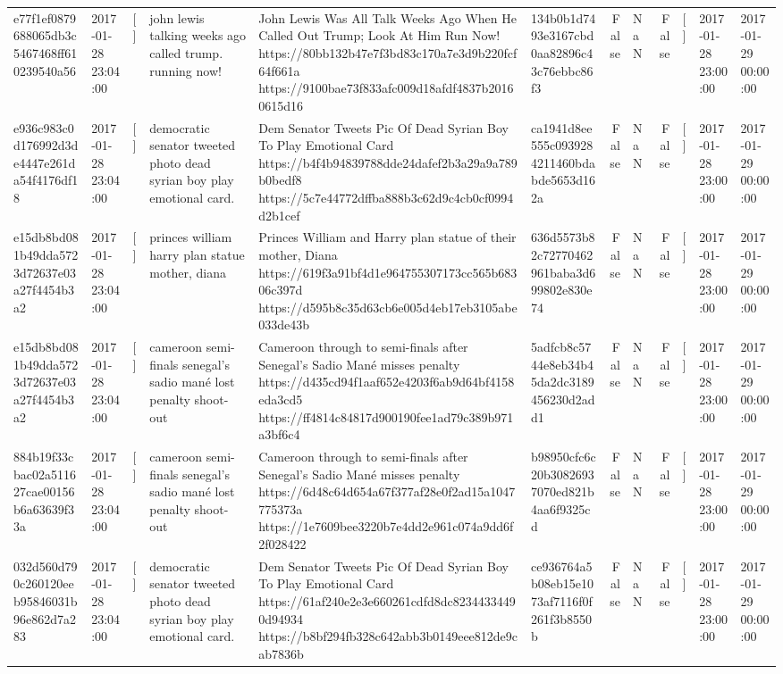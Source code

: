 \begin{tabular}{llllllrlrlll}
e77f1ef0879688065db3c5467468ff610239540a56 & 2017-01-28 23:04:00 & [] & john lewis talking weeks ago called trump. running now! & John Lewis Was All Talk Weeks Ago When He Called Out Trump; Look At Him Run Now! https://80bb132b47e7f3bd83c170a7e3d9b220fcf64f661a https://9100bae73f833afc009d18afdf4837b20160615d16 & 134b0b1d7493e3167cbd0aa82896c43c76ebbc86f3 & False & NaN & False & [] & 2017-01-28 23:00:00 & 2017-01-29 00:00:00 \\
e936c983c0d176992d3de4447e261da54f4176df18 & 2017-01-28 23:04:00 & [] & democratic senator tweeted photo dead syrian boy play emotional card. & Dem Senator Tweets Pic Of Dead Syrian Boy To Play Emotional Card https://b4f4b94839788dde24dafef2b3a29a9a789b0bedf8 https://5c7e44772dffba888b3c62d9c4cb0cf0994d2b1cef & ca1941d8ee555c0939284211460bdabde5653d162a & False & NaN & False & [] & 2017-01-28 23:00:00 & 2017-01-29 00:00:00 \\
e15db8bd081b49dda5723d72637e03a27f4454b3a2 & 2017-01-28 23:04:00 & [] & princes william harry plan statue mother, diana & Princes William and Harry plan statue of their mother, Diana https://619f3a91bf4d1e964755307173cc565b68306c397d https://d595b8c35d63cb6e005d4eb17eb3105abe033de43b & 636d5573b82c72770462961baba3d699802e830e74 & False & NaN & False & [] & 2017-01-28 23:00:00 & 2017-01-29 00:00:00 \\
e15db8bd081b49dda5723d72637e03a27f4454b3a2 & 2017-01-28 23:04:00 & [] & cameroon semi-finals senegal's sadio mané lost penalty shoot-out & Cameroon through to semi-finals after Senegal’s Sadio Mané misses penalty https://d435cd94f1aaf652e4203f6ab9d64bf4158eda3cd5 https://ff4814c84817d900190fee1ad79c389b971a3bf6c4 & 5adfcb8c5744e8eb34b45da2dc3189456230d2add1 & False & NaN & False & [] & 2017-01-28 23:00:00 & 2017-01-29 00:00:00 \\
884b19f33cbac02a511627cae00156b6a63639f33a & 2017-01-28 23:04:00 & [] & cameroon semi-finals senegal's sadio mané lost penalty shoot-out & Cameroon through to semi-finals after Senegal’s Sadio Mané misses penalty https://6d48c64d654a67f377af28e0f2ad15a1047775373a https://1e7609bee3220b7e4dd2e961c074a9dd6f2f028422 & b98950cfc6c20b30826937070ed821b4aa6f9325cd & False & NaN & False & [] & 2017-01-28 23:00:00 & 2017-01-29 00:00:00 \\
032d560d790c260120eeb95846031b96e862d7a283 & 2017-01-28 23:04:00 & [] & democratic senator tweeted photo dead syrian boy play emotional card. & Dem Senator Tweets Pic Of Dead Syrian Boy To Play Emotional Card https://61af240e2e3e660261cdfd8dc82344334490d94934 https://b8bf294fb328c642abb3b0149eee812de9cab7836b & ce936764a5b08eb15e1073af7116f0f261f3b8550b & False & NaN & False & [] & 2017-01-28 23:00:00 & 2017-01-29 00:00:00 \\

\end{tabular}

